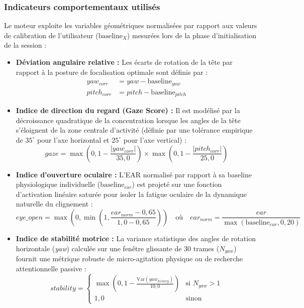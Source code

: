 \subsubsection{Indicateurs comportementaux utilisés}

Le moteur exploite les variables géométriques normalisées par rapport aux valeurs de calibration de l'utilisateur ($\text{baseline}_{X}$) mesurées lors de la phase d'initialisation de la session :
\begin{itemize}
    \item \textbf{Déviation angulaire relative :} Les écarts de rotation de la tête par rapport à la posture de focalisation optimale sont définis par :
    \begin{align*}
        yaw_{corr} &= yaw - \text{baseline}_{yaw} \\
        pitch_{corr} &= pitch - \text{baseline}_{pitch}
    \end{align*}
    \item \textbf{Indice de direction du regard (Gaze Score) :} Il est modélisé par la décroissance quadratique de la concentration lorsque les angles de la tête s'éloignent de la zone centrale d'activité (définie par une tolérance empirique de $35^\circ$ pour l'axe horizontal et $25^\circ$ pour l'axe vertical) :
    \begin{equation}
        gaze = \max\left(0, 1 - \frac{|yaw_{corr}|}{35,0}\right) \times \max\left(0, 1 - \frac{|pitch_{corr}|}{25,0}\right)
    \end{equation}
    \item \textbf{Indice d'ouverture oculaire :} L'EAR normalisé par rapport à sa baseline physiologique individuelle ($\text{baseline}_{ear}$) est projeté sur une fonction d'activation linéaire saturée pour isoler la fatigue oculaire de la dynamique naturelle du clignement :
    \begin{equation}
        eye\_open = \max\left(0, \min\left(1, \frac{ear_{norm} - 0,65}{1,0 - 0,65}\right)\right) \quad \text{où} \quad ear_{norm} = \frac{ear}{\max(\text{baseline}_{ear}, 0,20)}
    \end{equation}
    \item \textbf{Indice de stabilité motrice :} La variance statistique des angles de rotation horizontale (\textit{yaw}) calculée sur une fenêtre glissante de 30 trames ($N_{yaw}$) fournit une métrique robuste de micro-agitation physique ou de recherche attentionnelle passive :
    \begin{equation}
        stability = \begin{cases} \max\left(0, 1 - \frac{\text{Var}(yaw_{history})}{10,0}\right) & \text{si } N_{yaw} > 1 \\ 1,0 & \text{sinon} \end{cases}
    \end{equation}
\end{itemize}

